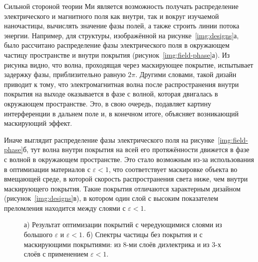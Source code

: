 
Сильной стороной теории Ми является возможность получать распределение
электрического и магнитного поля как внутри, так и вокруг изучаемой
наночастицы, вычислять значение фазы полей, а также строить линии
потока энергии.  Например, для структуры, изображённой на
рисунке~\ref{img:designs}а, было рассчитано распределение фазы
электрического поля в окружающем частицу пространстве и внутри
покрытия (рисунок~\ref{img:field-phase}а).  Из рисунка видно, что
волна, проходящая через маскирующее покрытие, испытывает задержку фазы,
приблизительно равную $2\pi$. Другими словами, такой дизайн приводит к
тому, что электромагнитная волна после распространения внутри покрытия
на выходе оказывается в фазе с волной, которая двигалась в окружающем
пространстве.  Это, в свою очередь, подавляет картину интерференции в
дальнем поле и, в конечном итоге, объясняет возникающий маскирующий
эффект.

Иначе выглядит распределение фазы электрического поля на
рисунке~\ref{img:field-phase}б, тут волна внутри покрытия на всей его
протяжённости движется в фазе с волной в окружающем пространстве. Это
стало возможным из-за использования в оптимизации материалов с
${\varepsilon<1}$, что соответствует маскировке объекта во вмещающей
среде, в которой скорость распространения света ниже, чем внутри
маскирующего покрытия.  Такие покрытия отличаются характерным дизайном
(рисунок~\ref{img:designs}в), в котором один слой с высоким
показателем преломления находится между слоями с ${\varepsilon<1}$.
\begin{figure}[t]
  \begin{minipage}[ht]{0.49\linewidth}
  \end{minipage}
  \hfill
  \begin{minipage}[ht]{0.49\linewidth}
  \end{minipage}
  \caption{а) Результат оптимизации покрытий с чередующимися слоями из
    большого $\varepsilon$ и ${\varepsilon<1}$. б) Спектры частицы
  без покрытия и с маскирующими покрытиями: из 8-ми слоёв диэлектрика и
  из 3-х слоёв с применением ${\varepsilon<1}$.}
  \label{img:min-max-min}  
\end{figure}

